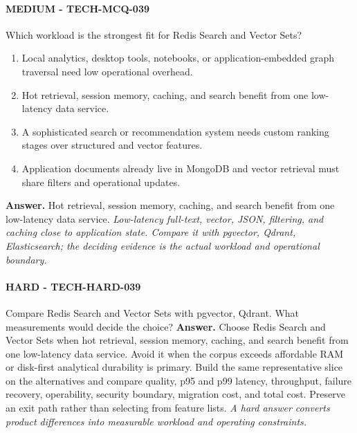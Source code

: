 \paragraph{MEDIUM - TECH-MCQ-039} Which workload is the strongest fit for Redis Search and Vector Sets?
\begin{enumerate}[label=\Alph*.]
\item Local analytics, desktop tools, notebooks, or application-embedded graph traversal need low operational overhead.
\item Hot retrieval, session memory, caching, and search benefit from one low-latency data service.
\item A sophisticated search or recommendation system needs custom ranking stages over structured and vector features.
\item Application documents already live in MongoDB and vector retrieval must share filters and operational updates.
\end{enumerate}
\textbf{Answer.} Hot retrieval, session memory, caching, and search benefit from one low-latency data service.
\textit{Low-latency full-text, vector, JSON, filtering, and caching close to application state. Compare it with pgvector, Qdrant, Elasticsearch; the deciding evidence is the actual workload and operational boundary.}
\paragraph{HARD - TECH-HARD-039} Compare Redis Search and Vector Sets with pgvector, Qdrant. What measurements would decide the choice?
\textbf{Answer.} Choose Redis Search and Vector Sets when hot retrieval, session memory, caching, and search benefit from one low-latency data service. Avoid it when the corpus exceeds affordable RAM or disk-first analytical durability is primary. Build the same representative slice on the alternatives and compare quality, p95 and p99 latency, throughput, failure recovery, operability, security boundary, migration cost, and total cost. Preserve an exit path rather than selecting from feature lists.
\textit{A hard answer converts product differences into measurable workload and operating constraints.}
